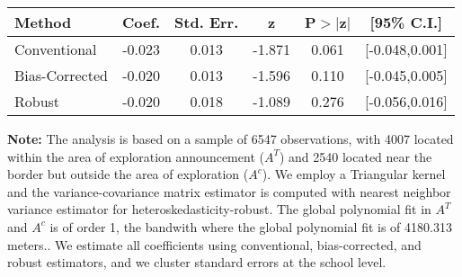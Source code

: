 \begin{table}[htbp]\centering
 \footnotesize 
\begin{tabular}{lccccc}
\hline\hline
Method & Coef. & Std. Err. & z & P$>|$z$|$ & [95\% C.I.] \\ 
\hline \hline  
Conventional & -0.023 & 0.013 & -1.871 & 0.061 & [-0.048,0.001] \\ 
 Bias-Corrected & -0.020 & 0.013 & -1.596 & 0.110 & [-0.045,0.005] \\ 
Robust & -0.020 & 0.018 & -1.089 & 0.276 & [-0.056,0.016] \\ 
  \hline\hline
\end{tabular}
\label{table:rd}
\begin{tablenotes} 
  \justifying \tiny \textbf{Note: }    
   The analysis is based on a sample of 6547 observations, with 4007 located within the area of exploration announcement ($A^{T}$) and 2540 located near the border but outside the area of exploration  ($A^{c}$). 
           We employ a Triangular kernel and the variance-covariance matrix estimator is computed with nearest neighbor variance estimator for heteroskedasticity-robust. The global polynomial fit in  $A^{T}$ and $A^{c}$ is of order 1, the bandwith where the global polynomial fit is of 4180.313 meters.. We estimate all coefficients using conventional, bias-corrected, and robust estimators, and we cluster standard errors at the school level. \end{tablenotes} 
 \end{table} 
